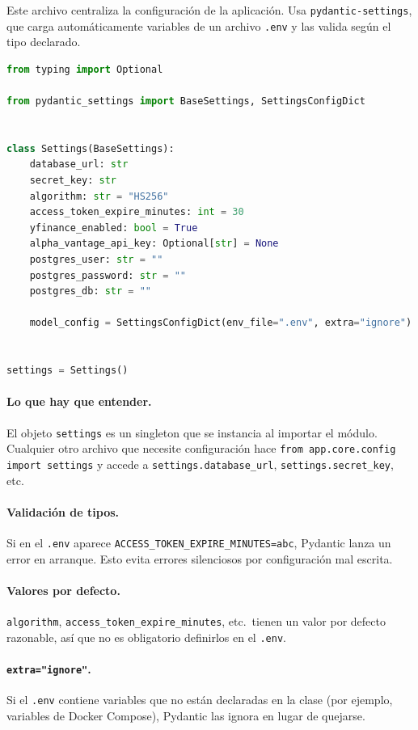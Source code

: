 \documentclass[11pt,a4paper]{book}
\begin{document}
Este archivo centraliza la configuración de la aplicación. Usa \texttt{pydantic-settings}, que carga automáticamente variables de un archivo \texttt{.env} y las valida según el tipo declarado.

\begin{lstlisting}[language=Python,caption={\texttt{backend/app/core/config.py}}]
from typing import Optional

from pydantic_settings import BaseSettings, SettingsConfigDict


class Settings(BaseSettings):
    database_url: str
    secret_key: str
    algorithm: str = "HS256"
    access_token_expire_minutes: int = 30
    yfinance_enabled: bool = True
    alpha_vantage_api_key: Optional[str] = None
    postgres_user: str = ""
    postgres_password: str = ""
    postgres_db: str = ""

    model_config = SettingsConfigDict(env_file=".env", extra="ignore")


settings = Settings()
\end{lstlisting}

\paragraph{Lo que hay que entender.} El objeto \texttt{settings} es un singleton que se instancia al importar el módulo. Cualquier otro archivo que necesite configuración hace \texttt{from app.core.config import settings} y accede a \texttt{settings.database\_url}, \texttt{settings.secret\_key}, etc.

\paragraph{Validación de tipos.} Si en el \texttt{.env} aparece \texttt{ACCESS\_TOKEN\_EXPIRE\_MINUTES=abc}, Pydantic lanza un error en arranque. Esto evita errores silenciosos por configuración mal escrita.

\paragraph{Valores por defecto.} \texttt{algorithm}, \texttt{access\_token\_expire\_minutes}, etc.\ tienen un valor por defecto razonable, así que no es obligatorio definirlos en el \texttt{.env}.

\paragraph{\texttt{extra="ignore"}.} Si el \texttt{.env} contiene variables que no están declaradas en la clase (por ejemplo, variables de Docker Compose), Pydantic las ignora en lugar de quejarse.
\end{document}
